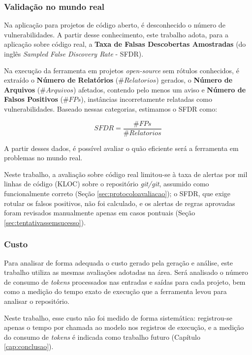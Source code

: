 \documentclass[
    12pt,                %
    openright,           %
    oneside,             %
    a4paper,             %
    english,             %
    brazil               %
]{abntex2}
\newcommand{\novo}[1]{{\color{red}#1}}
\begin{document}
\subsubsection{Validação no mundo real}
\label{sec:validademundoreal}
\par
Na aplicação para projetos de código aberto, é desconhecido o número de vulnerabilidades.
A partir desse conhecimento, este trabalho adota, para a aplicação sobre código real, a \textbf{Taxa de Falsas Descobertas Amostradas} (do inglês \textit{Sampled False Discovery Rate} - SFDR).
\par
Na execução da ferramenta em projetos \textit{open-source} sem rótulos conhecidos, é extraído o \textbf{Número de Relatórios} ($\#Relatorios$) gerados, o \textbf{Número de Arquivos} ($\#Arquivos$) afetados, contendo pelo menos um aviso e \textbf{Número de Falsos Positivos} ($\#FPs$), instâncias incorretamente relatadas como vulnerabilidades.
Baseado nessas categorias, estimamos o SFDR como:

\begin{equation}
  SFDR = \frac{\#FPs}{\#Relatorios}
\end{equation}

\vspace{\onelineskip}
A partir desses dados, é possível avaliar o quão eficiente será a ferramenta em problemas no mundo real.
\par
\novo{Neste trabalho, a avaliação sobre código real limitou-se à taxa de alertas por mil linhas de código (KLOC) sobre o repositório \textit{git/git}, assumido como funcionalmente correto (Seção \ref{sec:protocoloavaliacao}); o SFDR, que exige rotular os falsos positivos, não foi calculado, e os alertas de regras aprovadas foram revisados manualmente apenas em casos pontuais (Seção \ref{sec:tentativassemsucesso}).}

\subsubsection{Custo}
\label{sec:custo}
\par
Para analisar de forma adequada o custo gerado pela geração e análise, este trabalho utiliza as mesmas avaliações adotadas na área.
Será analisado o número de consumo de \textit{tokens} processados nas entradas e saídas para cada projeto, bem como a medição do tempo exato de execução que a ferramenta levou para analisar o repositório.
\par
\novo{Neste trabalho, esse custo não foi medido de forma sistemática: registrou-se apenas o tempo por chamada ao modelo nos registros de execução, e a medição do consumo de \textit{tokens} é indicada como trabalho futuro (Capítulo \ref{cap:conclusao}).}
\end{document}
